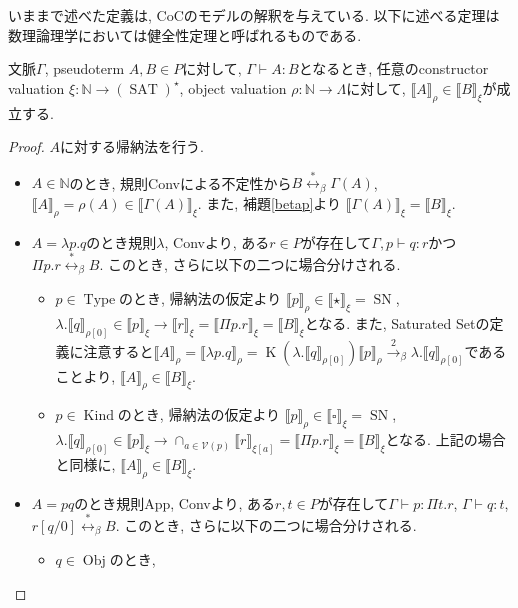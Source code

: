 \documentclass[12pt, titlepage]{ltjsarticle}
\DeclareMathOperator{\SN}{SN}
\DeclareMathOperator{\Obj}{Obj}
\DeclareMathOperator{\Type}{Type}
\DeclareMathOperator{\Kind}{Kind}
\DeclareMathOperator{\SAT}{SAT}
\DeclareMathOperator{\K}{K}
\newcommand{\iprt}[2]{\llbracket {#1} \rrbracket_ {#2}}
\begin{document}
いままで述べた定義は, CoCのモデルの解釈を与えている. 以下に述べる定理は数理論理学においては健全性定理と呼ばれるものである.

\begin{thm}
 文脈$\Gamma$, pseudoterm $A, B \in P$に対して, $\Gamma \vdash A \colon B$となるとき,
 任意のconstructor valuation $\xi : \mathbb{N} \rightarrow (\SAT)^\star$, object valuation $\rho : \mathbb{N} \rightarrow \Lambda$に対して, $\iprt{A}{\rho} \in \iprt{B}{\xi}$が成立する.
\end{thm}
\begin{proof}
 $A$に対する帰納法を行う.
 \begin{itemize}
  \item $A \in \mathbb{N}$のとき, 規則Convによる不定性から$B \overset{*}{\leftrightarrow}_\beta \Gamma(A)$, $\iprt{A}{\rho} = \rho (A) \in \iprt{\Gamma(A)}{\xi}$.
        また, 補題\ref{betap}より $\iprt{\Gamma(A)}{\xi} = \iprt{B}{\xi}$.
  \item $A = \lambda p. q$のとき規則$\lambda$, Convより, ある$r \in P$が存在して$\Gamma, p \vdash q \colon r$かつ$\Pi p. r \overset{*}{\leftrightarrow}_\beta B$. このとき, さらに以下の二つに場合分けされる.
 \begin{itemize}
  \item $p \in \Type$のとき, 帰納法の仮定より $\iprt{p}{\rho} \in \iprt{\star}{\xi} = \SN$, $\lambda . \iprt{q}{\rho[0]} \in \iprt{p}{\xi} \rightarrow \iprt{r}{\xi} = \iprt{\Pi p. r}{\xi} = \iprt{B}{\xi}$となる.
        また, Saturated Setの定義に注意すると$\iprt{A}{\rho} = \iprt{\lambda p. q}{\rho} = \K (\lambda . \iprt{q}{\rho[0]}) \iprt{p}{\rho} \overset{2}{\rightarrow}_\beta \lambda . \iprt{q}{\rho[0]}$であることより, $\iprt{A}{\rho} \in \iprt{B}{\xi}$.
  \item $p \in \Kind$のとき, 帰納法の仮定より $\iprt{p}{\rho} \in \iprt{\square}{\xi} = \SN$, $\lambda . \iprt{q}{\rho[0]} \in \iprt{p}{\xi} \rightarrow \cap_{a \in \mathcal{V}(p)} \iprt{r}{\xi[a]} = \iprt{\Pi p. r}{\xi} = \iprt{B}{\xi}$となる.
        上記の場合と同様に, $\iprt{A}{\rho} \in \iprt{B}{\xi}$.
 \end{itemize}
  \item $A = p q$のとき規則App, Convより, ある$r, t \in P$が存在して$\Gamma \vdash p \colon \Pi t. r$, $\Gamma \vdash q \colon t$, $r[q/0] \overset{*}{\leftrightarrow}_\beta B$. このとき, さらに以下の二つに場合分けされる.
 \begin{itemize}
  \item $q \in \Obj$のとき,
 \end{itemize}
 \end{itemize}
\end{proof}
\end{document}
